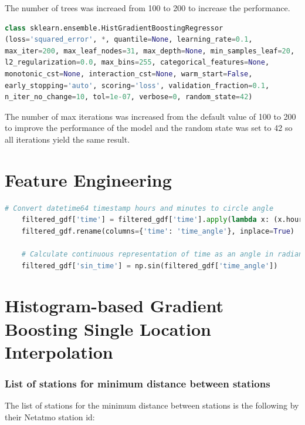 The number of trees was increaed from 100 to 200 to increase the performance.

\begin{lstlisting}[language=Python, caption=Histogram-based Gradient Boosting Parameters]
class sklearn.ensemble.HistGradientBoostingRegressor
(loss='squared_error', *, quantile=None, learning_rate=0.1,
max_iter=200, max_leaf_nodes=31, max_depth=None, min_samples_leaf=20,
l2_regularization=0.0, max_bins=255, categorical_features=None,
monotonic_cst=None, interaction_cst=None, warm_start=False,
early_stopping='auto', scoring='loss', validation_fraction=0.1,
n_iter_no_change=10, tol=1e-07, verbose=0, random_state=42)
\end{lstlisting}

The number of max iterations was increased from the default value of 100 to 200 to improve the performance of the model and the random state was set to 42 so all iterations yield the same result.

\section{Feature Engineering}

\begin{lstlisting}[language=Python, caption=Timestamp to Sinus Curve Feature, label=lst: timestamp to sin]
    # Convert datetime64 timestamp hours and minutes to circle angle
    filtered_gdf['time'] = filtered_gdf['time'].apply(lambda x: (x.hour * 60 + x.minute) * 2 * np.pi / (24 * 60))
    filtered_gdf.rename(columns={'time': 'time_angle'}, inplace=True)

    # Calculate continuous representation of time as an angle in radians
    filtered_gdf['sin_time'] = np.sin(filtered_gdf['time_angle'])
\end{lstlisting}

\section{Histogram-based Gradient Boosting Single Location Interpolation}

\subsubsection{List of stations for minimum distance between stations}
\label{appendix stations for minimum distance between stations}

The list of stations for the minimum distance between stations is the following by their Netatmo station id:

